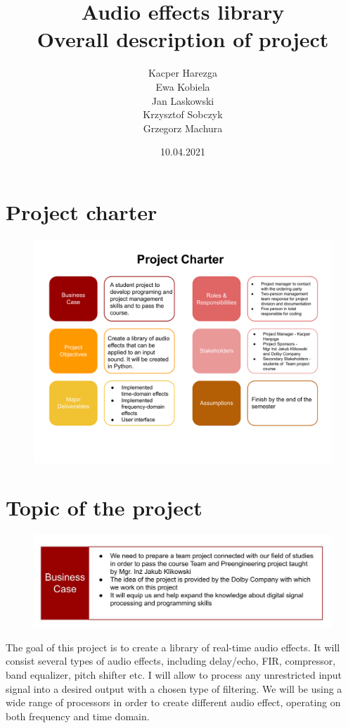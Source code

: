 \documentclass[12pt]{article}
\title{Audio effects library\\Overall description of project}
\author{Kacper Harezga\\Ewa Kobiela\\Jan Laskowski\\Krzysztof Sobczyk\\Grzegorz Machura}
\date{10.04.2021}
\begin{document}
	
	\maketitle
	\tableofcontents
	\newpage

\section{Project charter}

	\begin{figure}[H]
		\includegraphics[width=1.2\textwidth, center]{Project charter}
	\end{figure}
	

\section{Topic of the project}

	\begin{figure}[H]
		\includegraphics[width=1.2\textwidth, center]{Business Case}
	\end{figure}

The goal of this project is to create a library of real-time audio effects. It will consist several types of audio effects, including delay/echo, FIR, compressor, band equalizer, pitch shifter etc. I will allow to process any unrestricted input signal into a desired output with a chosen type of filtering. We will be using a wide range of processors in order to create different audio effect, operating on both frequency and time domain.
\end{document}
